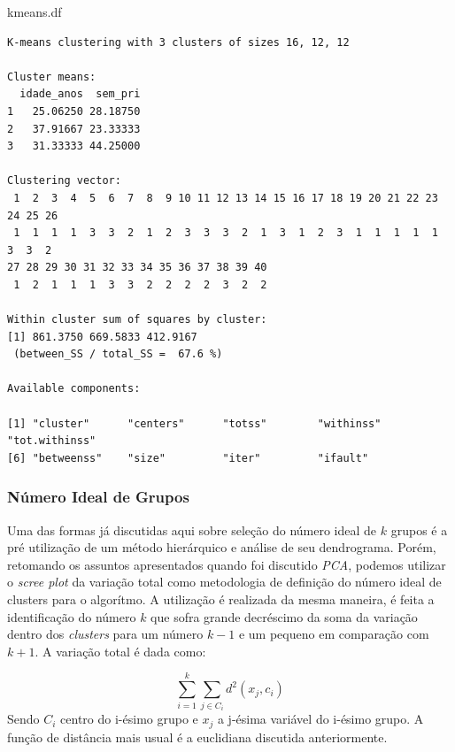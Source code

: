 \documentclass[
  letterpaper,
  DIV=11,
  numbers=noendperiod]{scrreprt}
\newenvironment{Shaded}{\begin{snugshade}}{\end{snugshade}}
\newcommand{\NormalTok}[1]{\textcolor[rgb]{0.00,0.23,0.31}{#1}}
\begin{document}
\begin{Shaded}
\begin{Highlighting}[]
\NormalTok{kmeans.df}
\end{Highlighting}
\end{Shaded}

\begin{verbatim}
K-means clustering with 3 clusters of sizes 16, 12, 12

Cluster means:
  idade_anos  sem_pri
1   25.06250 28.18750
2   37.91667 23.33333
3   31.33333 44.25000

Clustering vector:
 1  2  3  4  5  6  7  8  9 10 11 12 13 14 15 16 17 18 19 20 21 22 23 24 25 26 
 1  1  1  1  3  3  2  1  2  3  3  3  2  1  3  1  2  3  1  1  1  1  1  3  3  2 
27 28 29 30 31 32 33 34 35 36 37 38 39 40 
 1  2  1  1  1  3  3  2  2  2  2  3  2  2 

Within cluster sum of squares by cluster:
[1] 861.3750 669.5833 412.9167
 (between_SS / total_SS =  67.6 %)

Available components:

[1] "cluster"      "centers"      "totss"        "withinss"     "tot.withinss"
[6] "betweenss"    "size"         "iter"         "ifault"      
\end{verbatim}

\hypertarget{nuxfamero-ideal-de-grupos}{%
\subsubsection{Número Ideal de Grupos}\label{nuxfamero-ideal-de-grupos}}

Uma das formas já discutidas aqui sobre seleção do número ideal de \(k\)
grupos é a pré utilização de um método hierárquico e análise de seu
dendrograma. Porém, retomando os assuntos apresentados quando foi
discutido \emph{PCA}, podemos utilizar o \emph{scree plot} da variação
total como metodologia de definição do número ideal de clusters para o
algorítmo. A utilização é realizada da mesma maneira, é feita a
identificação do número \(k\) que sofra grande decréscimo da soma da
variação dentro dos \emph{clusters} para um número \(k-1\) e um pequeno
em comparação com \(k+1\). A variação total é dada como:

\[
\sum^k_{i=1}\sum_{j\in C_i}d^2(x_j,c_i)
\] Sendo \(C_i\) centro do i-ésimo grupo e \(x_j\) a j-ésima variável do
i-ésimo grupo. A função de distância mais usual é a euclidiana discutida
anteriormente.
\end{document}
